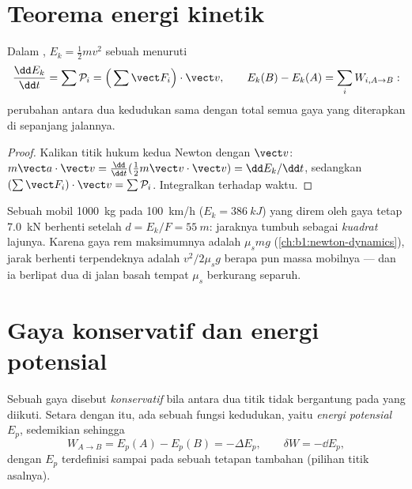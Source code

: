 \section{Teorema energi kinetik}

\begin{theorem}\label{thm:b1:work-and-energy:ke}
Dalam , \emph{} $E_k = \tfrac12 mv^2$
sebuah  menuruti
\[
\frac{\dd E_k}{\dd t} = \sum\mathcal P_i = \Big(\sum\vect F_i\Big)\cdot\vect v,
\qquad
E_k(B) - E_k(A) = \sum_i W_{i,A\to B}:
\]
perubahan  antara dua kedudukan sama dengan  total
semua gaya yang diterapkan di sepanjang jalannya.
\end{theorem}

\begin{proof}
Kalikan titik hukum kedua Newton dengan $\vect v$: $m\vect a\cdot\vect v =
\tfrac{\dd}{\dd t}(\tfrac12 m\vect v\cdot\vect v) = \dd E_k/\dd t$, sedangkan
$(\sum\vect F_i)\cdot\vect v = \sum\mathcal P_i$. Integralkan terhadap waktu.
\end{proof}

\begin{example}\label{ex:b1:work-and-energy:braking}
Sebuah mobil \qty{1000}{kg} pada \qty{100}{km/h} ($E_k = \qty{386}{kJ}$)
yang direm oleh gaya tetap \qty{7.0}{kN} berhenti setelah
$d = E_k/F = \qty{55}{m}$: jaraknya tumbuh sebagai \emph{kuadrat}
lajunya. Karena gaya rem maksimumnya adalah $\mu_smg$
(\cref{ch:b1:newton-dynamics}), jarak berhenti terpendeknya adalah
$v^2/2\mu_sg$ berapa pun massa mobilnya --- dan ia berlipat dua di jalan
basah tempat $\mu_s$ berkurang separuh.
\end{example}

\section{Gaya konservatif dan energi potensial}

\begin{definition}\label{def:b1:work-and-energy:conservative}
Sebuah gaya disebut \emph{konservatif} bila  antara dua titik
tidak bergantung pada  yang diikuti. Setara dengan itu, ada
sebuah fungsi kedudukan, yaitu \emph{energi potensial} $E_p$, sedemikian
sehingga
\[
W_{A\to B} = E_p(A) - E_p(B) = -\Delta E_p ,
\qquad \delta W = -\dd E_p ,
\]
dengan $E_p$ terdefinisi sampai pada sebuah tetapan tambahan (pilihan
titik asalnya).
\end{definition}

